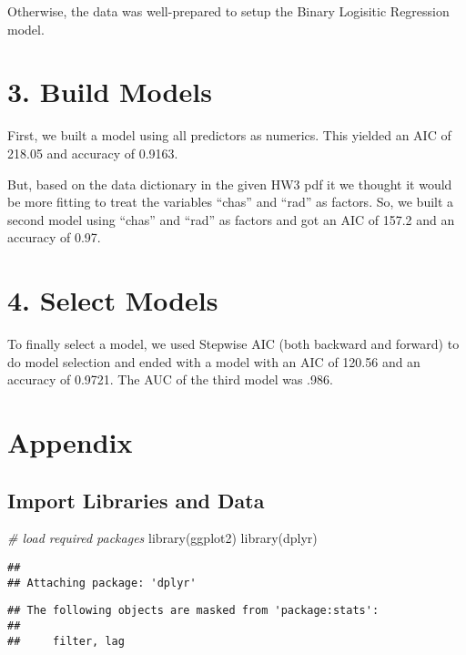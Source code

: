 \documentclass[
]{article}
\newenvironment{Shaded}{\begin{snugshade}}{\end{snugshade}}
\newcommand{\CommentTok}[1]{\textcolor[rgb]{0.56,0.35,0.01}{\textit{#1}}}
\newcommand{\FunctionTok}[1]{\textcolor[rgb]{0.00,0.00,0.00}{#1}}
\newcommand{\NormalTok}[1]{#1}
\begin{document}
Otherwise, the data was well-prepared to setup the Binary Logisitic
Regression model.

\hypertarget{build-models}{%
\section{3. Build Models}\label{build-models}}

First, we built a model using all predictors as numerics. This yielded
an AIC of 218.05 and accuracy of 0.9163.

But, based on the data dictionary in the given HW3 pdf it we thought it
would be more fitting to treat the variables ``chas'' and ``rad'' as
factors. So, we built a second model using ``chas'' and ``rad'' as
factors and got an AIC of 157.2 and an accuracy of 0.97.

\hypertarget{select-models}{%
\section{4. Select Models}\label{select-models}}

To finally select a model, we used Stepwise AIC (both backward and
forward) to do model selection and ended with a model with an AIC of
120.56 and an accuracy of 0.9721. The AUC of the third model was .986.

\hypertarget{appendix}{%
\section{Appendix}\label{appendix}}

\hypertarget{import-libraries-and-data}{%
\subsection{Import Libraries and Data}\label{import-libraries-and-data}}

\begin{Shaded}
\begin{Highlighting}[]
\CommentTok{\# load required packages}
\FunctionTok{library}\NormalTok{(ggplot2)}
\FunctionTok{library}\NormalTok{(dplyr)}
\end{Highlighting}
\end{Shaded}

\begin{verbatim}
## 
## Attaching package: 'dplyr'
\end{verbatim}

\begin{verbatim}
## The following objects are masked from 'package:stats':
## 
##     filter, lag
\end{verbatim}
\end{document}
